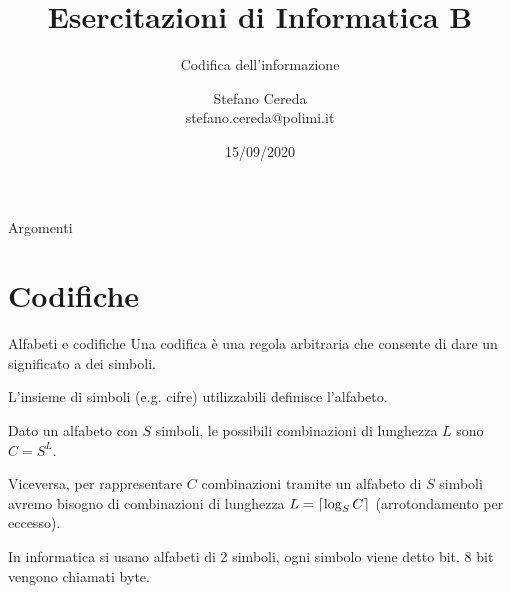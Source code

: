 \documentclass[aspectratio=169]{beamer}
\title{Esercitazioni di Informatica B}
\subtitle{Codifica dell'informazione}
\author{Stefano Cereda\\
	stefano.cereda@polimi.it
}
\date{15/09/2020}
\institute[PoliMi]{Politecnico Milano}
\DeclarePairedDelimiter{\ceil}{\lceil}{\rceil}
\begin{document}
	\begin{frame}
	\maketitle
	\end{frame}


	\begin{frame}{Argomenti}
	\tableofcontents
	\end{frame}

\section{Codifiche}

\begin{frame}{Alfabeti e codifiche}
Una codifica è una regola arbitraria che consente di dare un significato a dei simboli.

L'insieme di simboli (e.g. cifre) utilizzabili definisce l'alfabeto.

\pause
Dato un alfabeto con $S$ simboli, le possibili combinazioni di lunghezza $L$ sono $C = S^L$.

\pause
Viceversa, per rappresentare $C$ combinazioni tramite un alfabeto di $S$ simboli avremo bisogno di combinazioni di lunghezza $L = \ceil{\log_S C}$ (arrotondamento per eccesso).

\pause
In informatica si usano alfabeti di 2 simboli, ogni simbolo viene detto \alert{bit}. 8 bit vengono chiamati \alert{byte}.
\end{frame}
\end{document}
